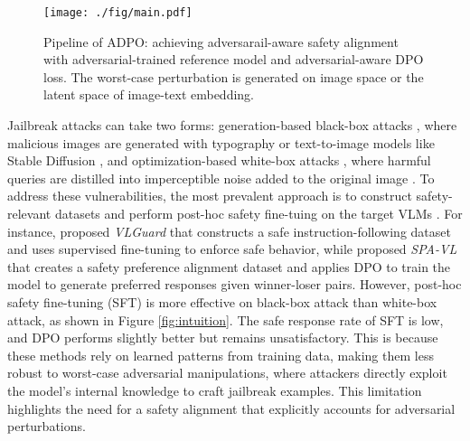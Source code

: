 \begin{figure*}[h!]
    \centering
    \texttt{[image: ./fig/main.pdf]}
    \setlength{\abovecaptionskip}{0.2cm}
    \caption{Pipeline of ADPO: achieving adversarail-aware safety alignment with adversarial-trained reference model and adversarial-aware DPO loss. The worst-case perturbation is generated on image space or the latent space of image-text embedding.} 
    \label{fig:main}
    \vspace{-1em}
\end{figure*}

Jailbreak attacks can take two forms: generation-based black-box attacks \cite{figstep, mm-safetybench}, where malicious images are generated with typography or text-to-image models like Stable Diffusion \cite{stable_diffusion}, and optimization-based white-box attacks \cite{visual_adv, imgjp}, where harmful queries are distilled into imperceptible noise added to the original image . 
To address these vulnerabilities, the most prevalent approach is to construct safety-relevant datasets and perform post-hoc safety fine-tuing on the target VLMs \cite{vlguard, spa-vl}. For instance, \citet{vlguard} proposed \textit{VLGuard} that constructs a safe instruction-following dataset and uses supervised fine-tuning to enforce safe behavior, while \citet{spa-vl} proposed \textit{SPA-VL} that creates a safety preference alignment dataset and applies DPO to train the model to generate preferred responses given winner-loser pairs.  
However, post-hoc safety fine-tuning (SFT) is more effective on black-box attack than white-box attack, as shown in Figure \ref{fig:intuition}. The safe response rate of SFT is low, and DPO performs slightly better but remains unsatisfactory. This is because these methods rely on learned patterns from training data, making them less robust to worst-case adversarial manipulations, where attackers directly exploit the model’s internal knowledge to craft jailbreak examples. This limitation highlights the need for a safety alignment that explicitly accounts for adversarial perturbations.




